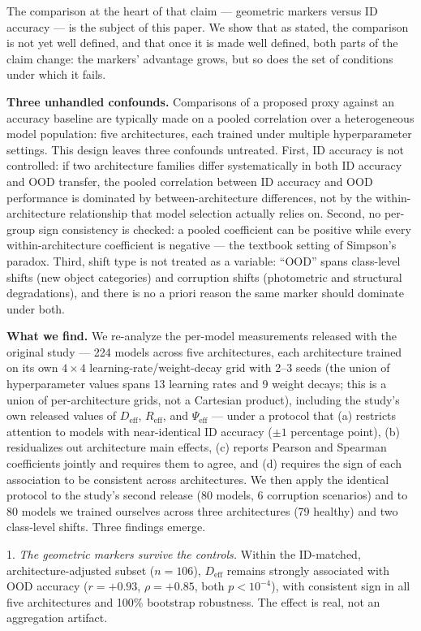 \documentclass[10pt]{article} %
\begin{document}
The comparison at the heart of that claim --- geometric markers versus ID accuracy --- is the subject of this paper. We show that as stated, the comparison is not yet well defined, and that once it is made well defined, both parts of the claim change: the markers' advantage grows, but so does the set of conditions under which it fails.

\textbf{Three unhandled confounds.} Comparisons of a proposed proxy against an accuracy baseline are typically made on a pooled correlation over a heterogeneous model population: five architectures, each trained under multiple hyperparameter settings. This design leaves three confounds untreated. First, ID accuracy is not controlled: if two architecture families differ systematically in both ID accuracy and OOD transfer, the pooled correlation between ID accuracy and OOD performance is dominated by between-architecture differences, not by the within-architecture relationship that model selection actually relies on. Second, no per-group sign consistency is checked: a pooled coefficient can be positive while every within-architecture coefficient is negative --- the textbook setting of Simpson's paradox. Third, shift type is not treated as a variable: ``OOD'' spans class-level shifts (new object categories) and corruption shifts (photometric and structural degradations), and there is no a priori reason the same marker should dominate under both.

\textbf{What we find.} We re-analyze the per-model measurements released with the original study --- 224 models across five architectures, each architecture trained on its own $4\times4$ learning-rate/weight-decay grid with 2--3 seeds (the union of hyperparameter values spans 13 learning rates and 9 weight decays; this is a union of per-architecture grids, not a Cartesian product), including the study's own released values of $D_{\mathrm{eff}}$, $R_{\mathrm{eff}}$, and $\Psi_{\mathrm{eff}}$ --- under a protocol that (a) restricts attention to models with near-identical ID accuracy ($\pm1$ percentage point), (b) residualizes out architecture main effects, (c) reports Pearson and Spearman coefficients jointly and requires them to agree, and (d) requires the sign of each association to be consistent across architectures. We then apply the identical protocol to the study's second release (80 models, 6 corruption scenarios) and to 80 models we trained ourselves across three architectures (79 healthy) and two class-level shifts. Three findings emerge.

1. \emph{The geometric markers survive the controls.} Within the ID-matched, architecture-adjusted subset ($n=106$), $D_{\mathrm{eff}}$ remains strongly associated with OOD accuracy ($r=+0.93$, $\rho=+0.85$, both $p<10^{-4}$), with consistent sign in all five architectures and 100\% bootstrap robustness. The effect is real, not an aggregation artifact.
\end{document}
